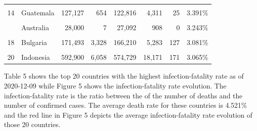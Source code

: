 \begin{table}[!h]
\begin{tabular}[t]{llrrrrrr}
\cellcolor{gray!6}{13} & \cellcolor{gray!6}{Tunisia} & \cellcolor{gray!6}{106,856} & \cellcolor{gray!6}{1,411} & \cellcolor{gray!6}{103,139} & \cellcolor{gray!6}{3,717} & \cellcolor{gray!6}{49} & \cellcolor{gray!6}{3.479\%}\\
14 & Guatemala & 127,127 & 654 & 122,816 & 4,311 & 25 & 3.391\%\\
\cellcolor{gray!6}{15} & \cellcolor{gray!6}{Mali} & \cellcolor{gray!6}{5,469} & \cellcolor{gray!6}{27} & \cellcolor{gray!6}{5,288} & \cellcolor{gray!6}{181} & \cellcolor{gray!6}{1} & \cellcolor{gray!6}{3.310\%}\\
\addlinespace
16 & Australia & 28,000 & 7 & 27,092 & 908 & 0 & 3.243\%\\
\cellcolor{gray!6}{17} & \cellcolor{gray!6}{Bosnia and Herzegovina} & \cellcolor{gray!6}{97,317} & \cellcolor{gray!6}{1,296} & \cellcolor{gray!6}{94,166} & \cellcolor{gray!6}{3,151} & \cellcolor{gray!6}{70} & \cellcolor{gray!6}{3.238\%}\\
18 & Bulgaria & 171,493 & 3,328 & 166,210 & 5,283 & 127 & 3.081\%\\
\cellcolor{gray!6}{19} & \cellcolor{gray!6}{Malawi} & \cellcolor{gray!6}{6,051} & \cellcolor{gray!6}{0} & \cellcolor{gray!6}{5,865} & \cellcolor{gray!6}{186} & \cellcolor{gray!6}{0} & \cellcolor{gray!6}{3.074\%}\\
20 & Indonesia & 592,900 & 6,058 & 574,729 & 18,171 & 171 & 3.065\%\\
\bottomrule
\end{tabular}
\end{table}
Table 5 shows the top 20 countries with the highest infection-fatality rate as of 2020-12-09 while Figure 5 shows the infection-fatality rate evolution. The infection-fatality rate is the ratio between the of the number of deaths and the number of confirmed cases. The average death rate for these countries is 4.521\% and the red line in Figure 5 depicts the average infection-fatality rate evolution of those 20 countries.

